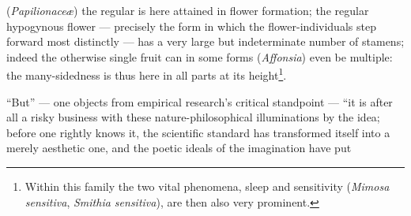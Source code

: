 \documentclass[12pt,a4paper]{book}
\begin{document}
\setcounter{footnote}{0}
(\textit{Papilionaceæ}) the regular is here attained in flower formation; the
regular hypogynous flower --- precisely the form in which the flower-individuals
step forward most distinctly --- has a very large but indeterminate number of
stamens; indeed the otherwise single fruit can in some forms
(\textit{Affonsia}) even be multiple: the many-sidedness is thus here in all parts
at its height\footnote{Within this family the two vital phenomena, sleep and
sensitivity (\textit{Mimosa sensitiva}, \textit{Smithia sensitiva}), are then also
very prominent.}.

``But'' --- one objects from empirical research's critical standpoint --- ``it is
after all a risky business with these nature-philosophical illuminations by the
idea; before one rightly knows it, the scientific standard has transformed itself
into a merely aesthetic one, and the poetic ideals of the imagination have put
\end{document}
